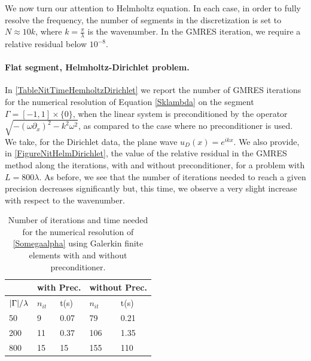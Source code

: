 \documentclass[a4paper]{article}
\begin{document}
\vspace*{0.5cm}

We now turn our attention to Helmholtz equation. In each case, in order to fully resolve the frequency, the number of segments in the 
discretization is set to $N \approx 10k$, where $k = \frac{\pi}{\lambda}$ is the wavenumber. In the GMRES iteration, we require a relative 
residual below $10^{-8}$. 

\paragraph{Flat segment, Helmholtz-Dirichlet problem.} 
In \autoref{TableNitTimeHemholtzDirichlet} we report the number of GMRES iterations for the numerical resolution of Equation \eqref{Sklambda} 
on the segment $\Gamma = [-1,1]\times \{0\}$, when the linear system is preconditioned by the operator $\sqrt{-(\omega \partial_x)^2 - k^2 \omega^2}$, as 
compared to the case where no preconditioner is used.  We take, for the Dirichlet data, the plane wave $u_D(x) = e^{ikx}$. We also provide, in 
\autoref{FigureNitHelmDirichlet}, the value of the relative residual in the GMRES method along the iterations, with and without preconditioner, 
for a problem with $L = 800 \lambda$. As before, we see that the number of iterations needed to reach a given precision decreases significantly but, this time, 
we observe a very slight increase with respect to the wavenumber. 
\begin{table}[H]
	\begin{center}
		\begin{tabular}{m{4em} | m{4em} | m{4em} | m{4em} | m{4em}} 
			\hline
			\multicolumn{1}{c|}{ }&
			\multicolumn{2}{c|}{with Prec.}&\multicolumn{2}{c}{without Prec.}\\
			\hline
			${\left\lvert \Gamma \right\rvert}/{\lambda}$ & $n_{it}$& t(s) & $n_{it}$ & t(s)\\
			\hline\hline
			50 & 9 & 0.07 & 79 & 0.21\\
			\hline
			200 & 11 & 0.37 & 106 & 1.35\\
			\hline
			800 & 15 & 15 & 155 & 110\\
			\hline
		\end{tabular}
	\end{center}
	\caption{Number of iterations and time needed for the numerical resolution of \eqref{Somegaalpha} using Galerkin finite elements with and without preconditioner.}
	\label{TableNitTimeHemholtzDirichlet}
\end{table}
\end{document}
